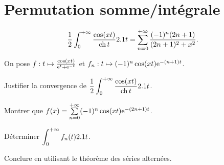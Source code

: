 \section{Permutation somme/intégrale}


\begin{prop}{}
\[
\frac{1}{2} \int_{0}^{+ \infty} \frac{\cos (xt)}{\operatorname{ch} t} 2.1 t = \sum_{n=0}^{+ \infty} \frac{(-1)^n (2n+1)}{(2n+1)^2 + x^2}.
\]
\end{prop}

\begin{exercice}
On pose $f : t \mapsto \frac{\cos(x t)}{\mathrm{e}^t + \mathrm{e}^{-t}}$ et $f_n : t \mapsto (-1)^n \cos(x t) \mathrm{e}^{-(n + 1) t}$.
\begin{questions}
\item Justifier la convergence de $\displaystyle\frac{1}{2} \int_{0}^{+ \infty} \frac{\cos (xt)}{\operatorname{ch} t} 2.1 t$.

\item Montrer que $f(x) = \sum\limits_{n=0}^{+\infty} (-1)^n \cos(x t) \mathrm{e}^{-(2 n + 1) t}$.

\item Déterminer $\displaystyle\int_0^{+\infty} f_n(t) 2.1 t$.

\item Conclure en utilisant le théorème des séries alternées.
\end{questions}
\end{exercice}


